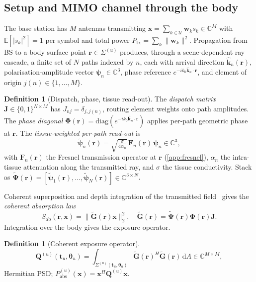\documentclass[journal,twocolumn,10pt]{IEEEtran}
\theoremstyle{definition}
\newtheorem{definition}[theorem]{Definition}
\newcommand{\khat}{\hat{\bm{k}}}
\newcommand{\rr}{\mathbf{r}}
\newcommand{\xx}{\mathbf{x}}
\newcommand{\ww}{\mathbf{w}}
\newcommand{\Sab}{S_{\mathrm{ab}}}
\newcommand{\Pabs}{P_{\mathrm{abs}}}
\newcommand{\Ptx}{P_{\mathrm{tx}}}
\newcommand{\Q}{\mathbf{Q}}
\newcommand{\Jmat}{\mathbf{J}}
\newcommand{\Phimat}{\mathbf{\Phi}}
\newcommand{\Psitil}{\tilde{\bm{\Psi}}}
\newcommand{\Gtil}{\tilde{\mathbf{G}}}
\newcommand{\diff}{\mathrm{d}}
\newcommand{\Complex}{\mathbb{C}}
\newcommand{\Users}{\mathcal{U}}
\begin{document}
\subsection{Setup and MIMO channel through the body}

The base station has $M$ antennas transmitting
$\xx=\sum_{k\in\Users}\ww_ks_k\in\Complex^M$ with
$\mathbb{E}[|s_k|^2]=1$ per symbol and total power
$\Ptx=\sum_k\|\ww_k\|^2$. Propagation from BS to a body surface
point $\rr\in\Sigma^{(u)}$ produces, through a scene-dependent ray
cascade, a finite set of $N$ paths indexed by $n$, each with
arrival direction $\khat_n(\rr)$, polarisation-amplitude vector
$\bm\psi_n\in\Complex^3$, phase reference
$e^{-ik_0\khat_n\cdot\rr}$, and element of origin $j(n)\in\{1,\dots,M\}$.

\begin{definition}[Dispatch, phase, tissue read-out]\label{def:JMphi}
The \emph{dispatch matrix} $\Jmat\in\{0,1\}^{N\times M}$ has
$J_{nj}=\delta_{j,j(n)}$, routing element weights onto path
amplitudes. The \emph{phase diagonal}
$\Phimat(\rr)=\mathrm{diag}(e^{-ik_0\khat_n\cdot\rr})$ applies
per-path geometric phase at $\rr$. The
\emph{tissue-weighted per-path read-out} is
\begin{equation}\label{eq:psitil}
  \tilde{\bm\psi}_n(\rr)=\sqrt{\tfrac{\sigma}{4\alpha_n}}\,
  \mathbf{F}_n(\rr)\,\bm\psi_n \in \Complex^3,
\end{equation}
with $\mathbf{F}_n(\rr)$ the Fresnel transmission operator at
$\rr$ (\cref{app:fresnel}), $\alpha_n$ the intra-tissue
attenuation along the transmitted ray, and $\sigma$ the tissue
conductivity. Stack as
$\Psitil(\rr)=[\tilde{\bm\psi}_1(\rr),\dots,\tilde{\bm\psi}_N(\rr)]\in\Complex^{3\times N}$.
\end{definition}

Coherent superposition and depth integration of the transmitted
field~\cite{WydaegheMonograph} gives the \emph{coherent absorption
law}
\begin{equation}\label{eq:Sab-coherent}
  \Sab(\rr,\xx)=\bigl\|\Gtil(\rr)\xx\bigr\|_2^2,\quad
  \Gtil(\rr)=\Psitil(\rr)\Phimat(\rr)\Jmat.
\end{equation}
Integration over the body gives the exposure operator.

\begin{definition}[Coherent exposure operator]\label{def:Q}
\begin{equation}\label{eq:Q-def}
  \Q^{(u)}(\mathbf{t}_u,\bm\theta_u)=
  \int_{\Sigma^{(u)}(\mathbf{t}_u,\bm\theta_u)}
  \Gtil(\rr)^H\Gtil(\rr)\,\diff A
  \in\Complex^{M\times M},
\end{equation}
Hermitian PSD; $\Pabs^{(u)}(\xx)=\xx^H\Q^{(u)}\xx$.
\end{definition}
\end{document}
